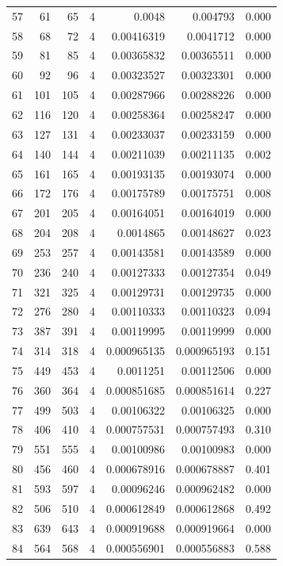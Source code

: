 \begin{tabular}{r r r r r r r}
57 & 61 & 65 & 4 & 0.0048 & 0.004793 & 0.000 \\
58 & 68 & 72 & 4 & 0.00416319 & 0.0041712 & 0.000 \\
59 & 81 & 85 & 4 & 0.00365832 & 0.00365511 & 0.000 \\
60 & 92 & 96 & 4 & 0.00323527 & 0.00323301 & 0.000 \\
61 & 101 & 105 & 4 & 0.00287966 & 0.00288226 & 0.000 \\
62 & 116 & 120 & 4 & 0.00258364 & 0.00258247 & 0.000 \\
63 & 127 & 131 & 4 & 0.00233037 & 0.00233159 & 0.000 \\
64 & 140 & 144 & 4 & 0.00211039 & 0.00211135 & 0.002 \\
65 & 161 & 165 & 4 & 0.00193135 & 0.00193074 & 0.000 \\
66 & 172 & 176 & 4 & 0.00175789 & 0.00175751 & 0.008 \\
67 & 201 & 205 & 4 & 0.00164051 & 0.00164019 & 0.000 \\
68 & 204 & 208 & 4 & 0.0014865 & 0.00148627 & 0.023 \\
69 & 253 & 257 & 4 & 0.00143581 & 0.00143589 & 0.000 \\
70 & 236 & 240 & 4 & 0.00127333 & 0.00127354 & 0.049 \\
71 & 321 & 325 & 4 & 0.00129731 & 0.00129735 & 0.000 \\
72 & 276 & 280 & 4 & 0.00110333 & 0.00110323 & 0.094 \\
73 & 387 & 391 & 4 & 0.00119995 & 0.00119999 & 0.000 \\
74 & 314 & 318 & 4 & 0.000965135 & 0.000965193 & 0.151 \\
75 & 449 & 453 & 4 & 0.0011251 & 0.00112506 & 0.000 \\
76 & 360 & 364 & 4 & 0.000851685 & 0.000851614 & 0.227 \\
77 & 499 & 503 & 4 & 0.00106322 & 0.00106325 & 0.000 \\
78 & 406 & 410 & 4 & 0.000757531 & 0.000757493 & 0.310 \\
79 & 551 & 555 & 4 & 0.00100986 & 0.00100983 & 0.000 \\
80 & 456 & 460 & 4 & 0.000678916 & 0.000678887 & 0.401 \\
81 & 593 & 597 & 4 & 0.00096246 & 0.000962482 & 0.000 \\
82 & 506 & 510 & 4 & 0.000612849 & 0.000612868 & 0.492 \\
83 & 639 & 643 & 4 & 0.000919688 & 0.000919664 & 0.000 \\
84 & 564 & 568 & 4 & 0.000556901 & 0.000556883 & 0.588 \\

\end{tabular}
